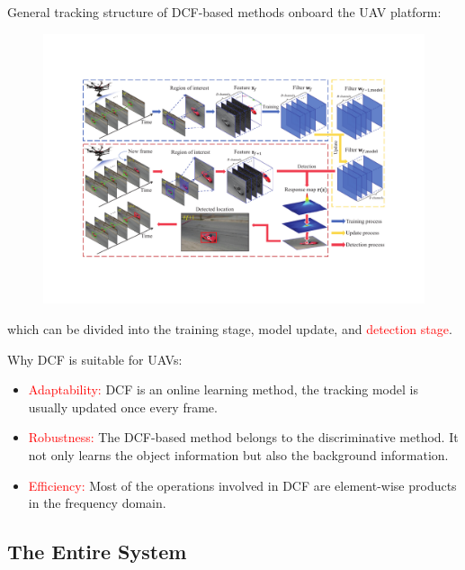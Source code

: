 \documentclass{beamer}
\begin{document}
\begin{frame}

    \addtocounter{footnote}{-1}
    \addtocounter{framenumber}{-1}
    General tracking structure of DCF-based methods onboard the UAV platform:

    \begin{figure}[htpb]
        \begin{center}
            \includegraphics[width=0.7\linewidth, trim={100pt 100 100 90}]{fig/tracking_3.pdf}
        \end{center}
    \end{figure}

    which can be divided into the training stage, model update, and \textcolor{red}{detection stage}.

\end{frame}

\begin{frame}
    Why DCF is suitable for UAVs:
    \begin{itemize}
        \item \textcolor{red}{Adaptability:} DCF is an online learning method, the tracking model is usually updated once every frame.
        \item \textcolor{red}{Robustness:} The DCF-based method belongs to the discriminative method. It not only learns the object information but also the background information. 
        \item \textcolor{red}{Efficiency:} Most of the operations involved in DCF are element-wise products in the frequency domain.
    \end{itemize}
\end{frame}

\subsection{The Entire System}
\end{document}
